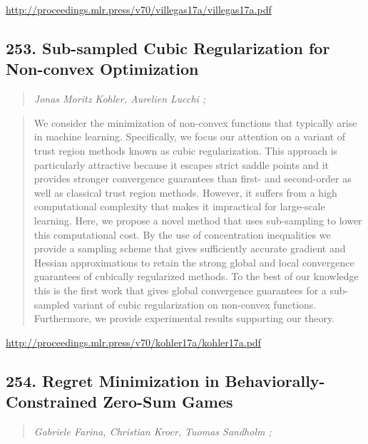 \documentclass{article}
\begin{document}
\href{http://proceedings.mlr.press/v70/villegas17a/villegas17a.pdf}{http://proceedings.mlr.press/v70/villegas17a/villegas17a.pdf}

\subsection{253. Sub-sampled Cubic Regularization for Non-convex Optimization}

\begin{quote}
\footnotesize{\textit{Jonas Moritz Kohler, Aurelien Lucchi ;}}

\end{quote}

\begin{quote}
    We consider the minimization of non-convex functions that typically arise in machine learning. Specifically, we focus our attention on a variant of trust region methods known as cubic regularization. This approach is particularly attractive because it escapes strict saddle points and it provides stronger convergence guarantees than first- and second-order as well as classical trust region methods. However, it suffers from a high computational complexity that makes it impractical for large-scale learning. Here, we propose a novel method that uses sub-sampling to lower this computational cost. By the use of concentration inequalities we provide a sampling scheme that gives sufficiently accurate gradient and Hessian approximations to retain the strong global and local convergence guarantees of cubically regularized methods. To the best of our knowledge this is the first work that gives global convergence guarantees for a sub-sampled variant of cubic regularization on non-convex functions. Furthermore, we provide experimental results supporting our theory.  
\end{quote}

\href{http://proceedings.mlr.press/v70/kohler17a/kohler17a.pdf}{http://proceedings.mlr.press/v70/kohler17a/kohler17a.pdf}

\subsection{254. Regret Minimization in Behaviorally-Constrained Zero-Sum Games}

\begin{quote}
\footnotesize{\textit{Gabriele Farina, Christian Kroer, Tuomas Sandholm ;}}

\end{quote}
\end{document}
